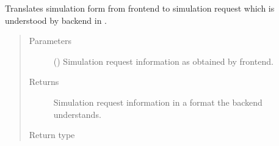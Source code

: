 \documentclass[a4paper,landscape,10pt,english]{sphinxmanual}
\begin{document}

\begin{fulllineitems}
\label{\detokenize{code_docs/simulation_API.controller:simulation_API.controller.tasks._sim_form_to_sim_request}}
Translates simulation form \textendash{}from frontend\textendash{} to simulation request which
is understood by backend in
{\hyperref[\detokenize{code_docs/simulation_API.controller:simulation_API.controller.tasks._api_simulation_request}]{}}.
\begin{quote}\begin{description}
\item[{Parameters}] \leavevmode
{} (\sphinxstyleliteralemphasis{\sphinxupquote{{[}}}\sphinxstyleliteralemphasis{\sphinxupquote{, }}\sphinxstyleliteralemphasis{\sphinxupquote{{]}}}) \textendash{} Simulation request information as obtained by frontend.

\item[{Returns}] \leavevmode
Simulation request information in a format the backend understands.

\item[{Return type}] \leavevmode
{\hyperref[\detokenize{code_docs/simulation_API.controller:simulation_API.controller.schemas.SimRequest}]{}}

\end{description}\end{quote}

\end{fulllineitems}



\paragraph{}
\label{\detokenize{code_docs/simulation_API.model:simulation-api-model}}\label{\detokenize{code_docs/simulation_API.model::doc}}
\end{document}
